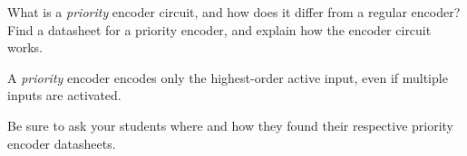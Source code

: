 

What is a {\it priority} encoder circuit, and how does it differ from a regular encoder?  Find a datasheet for a priority encoder, and explain how the encoder circuit works.







A {\it priority} encoder encodes only the highest-order active input, even if multiple inputs are activated.







Be sure to ask your students where and how they found their respective priority encoder datasheets.




